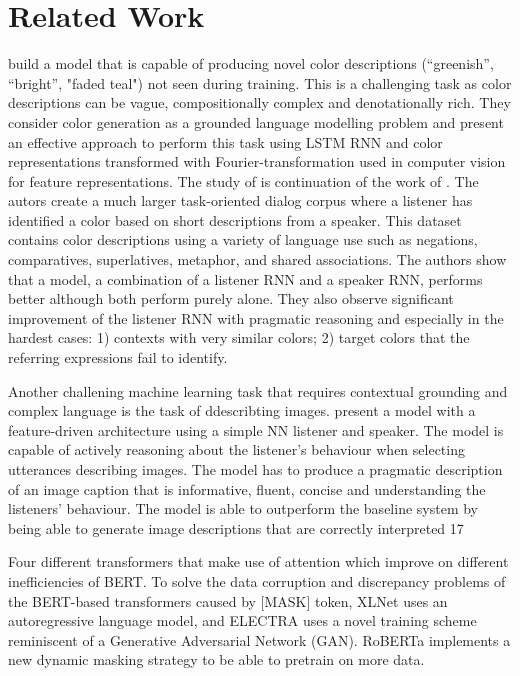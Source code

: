 \section{Related Work}

\citep{monroe-2016-compositional} build a model that is capable of producing novel color descriptions (“greenish”, “bright”, "faded teal") not seen during training. This is a challenging task as color descriptions can be vague, compositionally complex and denotationally rich. They consider color generation as a grounded language modelling problem and present an effective approach to perform this task using LSTM RNN and color representations transformed with Fourier-transformation used in computer vision for feature representations. The study of \citep{monroe-2017-colors} is continuation of the work of \citep{monroe-2016-compositional}. The autors create a much larger task-oriented dialog corpus \citep{moroe-2017-colors-reference-dataset} where a listener has identified a color based on short descriptions from a speaker. This dataset contains color descriptions using a variety of language use such as negations, comparatives, superlatives, metaphor, and shared associations. The authors show that a model, a combination of a listener RNN and a speaker RNN, performs better although both perform purely alone. They also observe significant improvement of the listener RNN with pragmatic reasoning and especially in the hardest cases: 1) contexts with very similar colors; 2) target colors that the referring expressions fail to identify.

\par
Another challening machine learning task that requires contextual grounding and complex language is the task of ddescribting images. \citep{andreas-2016-reasoning} present a model with a feature-driven architecture using a simple NN listener and speaker. The model is capable of actively reasoning about the listener’s behaviour when selecting utterances describing images. The model has to produce a pragmatic description of an image caption that is informative, fluent, concise and understanding the listeners’ behaviour. The model is able to outperform the baseline system by being able to generate image descriptions that are correctly interpreted 17%

\par
Four different transformers that make use of attention which improve on different inefficiencies of BERT. To solve the data corruption and discrepancy problems of the BERT-based transformers caused by [MASK] token, XLNet uses an autoregressive language model, and ELECTRA uses a novel training scheme reminiscent of a Generative Adversarial Network (GAN). RoBERTa implements a new dynamic masking strategy to be able to pretrain on more data.

